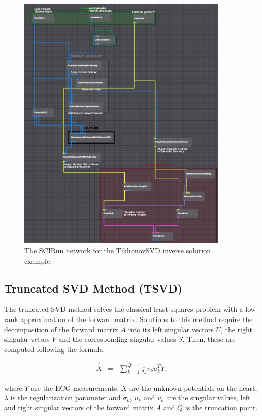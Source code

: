     \begin{figure}
        \begin{center}
        \includegraphics[width=0.9\textwidth]{ECGToolkitGuide_figures/TikhonovSVDNetwork.png}
        \caption{The SCIRun network for the TikhonovSVD inverse solution example.}
        \label{fig:TikhonovNetworkExampleSVD}
        \end{center}
    \end{figure}



\subsection{Truncated SVD Method (TSVD)}

    The truncated SVD method solves the classical least-squares problem with a low-rank approximation of the forward matrix.
    Solutions to this method require the decomposition of the forward matrix $A$ into its left singular vectors $U$, the right singular vetors $V$ and the corresponding singular values $S$.
    Then, these are computed following the formula:
    \begin{center}
    \begin{eqnarray}
        \hat{X}   &=& \sum_{k=1}^Q \frac{1}{\sigma_k} v_k u_k^T Y,
    \label{eq:inverseSec_TikhonovSolutions1}
    \end{eqnarray}
    \end{center}
    where $Y$ are the ECG measurements, $X$ are the unknown potentials on the heart, $\lambda$ is the regularization parameter and $\sigma_k$, $u_k$ and $v_k$ are the singular values, left and right singular vectors of the forward matrix $A$ and $Q$ is the truncation point.

